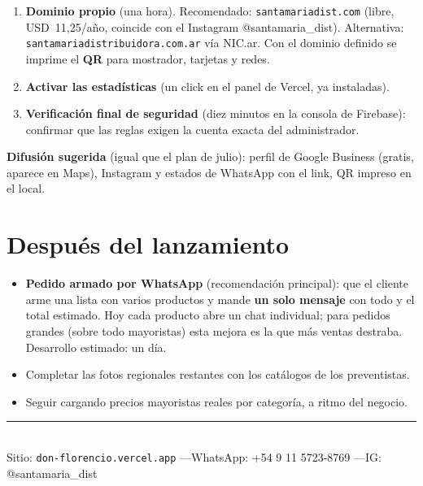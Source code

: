 \documentclass[a4paper,11pt]{article}
\begin{document}
\begin{enumerate}[leftmargin=1.4em, itemsep=4pt]
  \item \textbf{Dominio propio} (una hora). Recomendado: \texttt{santamariadist.com}
        (libre, USD~11,25/a\~no, coincide con el Instagram @santamaria\_dist).
        Alternativa: \texttt{santamariadistribuidora.com.ar} v\'ia NIC.ar.
        Con el dominio definido se imprime el \textbf{QR} para mostrador, tarjetas y redes.
  \item \textbf{Activar las estad\'isticas} (un click en el panel de Vercel, ya instaladas).
  \item \textbf{Verificaci\'on final de seguridad} (diez minutos en la consola de Firebase):
        confirmar que las reglas exigen la cuenta exacta del administrador.
\end{enumerate}

\textbf{Difusi\'on sugerida} (igual que el plan de julio): perfil de Google Business (gratis,
aparece en Maps), Instagram y estados de WhatsApp con el link, QR impreso en el local.

\section{Despu\'es del lanzamiento}

\begin{itemize}[leftmargin=1.2em, itemsep=3pt]
  \item \textbf{Pedido armado por WhatsApp} (recomendaci\'on principal): que el cliente
        arme una lista con varios productos y mande \textbf{un solo mensaje} con todo y el
        total estimado. Hoy cada producto abre un chat individual; para pedidos grandes
        (sobre todo mayoristas) esta mejora es la que m\'as ventas destraba. Desarrollo
        estimado: un d\'ia.
  \item Completar las fotos regionales restantes con los cat\'alogos de los preventistas.
  \item Seguir cargando precios mayoristas reales por categor\'ia, a ritmo del negocio.
\end{itemize}

\vspace{1em}
\begin{center}
\color{vino}\rule{0.6\textwidth}{0.4pt}\\[6pt]
\small Sitio: \texttt{don-florencio.vercel.app} \quad---\quad WhatsApp: +54 9 11 5723-8769 \quad---\quad IG: @santamaria\_dist
\end{center}
\end{document}
